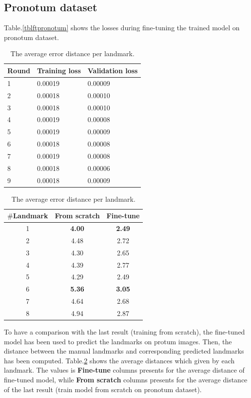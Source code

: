 \documentclass[12pt,a4paper]{article}
\begin{document}
\subsection{Pronotum dataset}
Table.\ref{tblftpronotum} shows the losses during fine-tuning the trained model on pronotum dataset.
\begin{table}[htbp]
\begin{minipage}[b]{.5\textwidth}
	\centering
	\begin{tabular}{l l l}
	Round & Training loss & Validation loss \\ \hline
	1 & 0.00019 & 0.00009  \\ \hline
	2 & 0.00018 & 0.00010 \\ \hline
	3 & 0.00018 & 0.00010 \\ \hline
	4 & 0.00019 & 0.00008 \\ \hline
	5 & 0.00019 & 0.00009 \\ \hline
	6 & 0.00018 & 0.00008 \\ \hline
	7 & 0.00019 & 0.00008 \\ \hline
	8 & 0.00018 & 0.00006 \\ \hline
	9 & 0.00018 & 0.00009 \\ \hline
	\end{tabular}
	\caption{The losses during fine-tuning model on pronotum dataset}
	\label{tblftpronotum}
\end{minipage}
\hfill
\begin{minipage}[b]{.5\textwidth}
\centering
\begin{tabular}{|c|c|c|}
\hline
\textbf{$\#$Landmark} & \textbf{From scratch} & \textbf{Fine-tune} \\ \hline
1 & \textbf{4.00} & \textbf{2.49}  \\ \hline
2 & 4.48 & 2.72  \\ \hline
3 & 4.30  & 2.65 \\ \hline
4 & 4.39  & 2.77 \\ \hline
5 & 4.29  & 2.49 \\ \hline
6 & \textbf{5.36}  & \textbf{3.05} \\ \hline
7 & 4.64  & 2.68 \\ \hline
8 & 4.94  & 2.87 \\ \hline
\end{tabular}
\caption{The average error distance per landmark.}
\label{tblcmppronotum}
\end{minipage}
\end{table}

To have a comparison with the last result (training from scratch), the fine-tuned model has been used to predict the landmarks on protum images. Then, the distance between the manual landmarks and corresponding predicted landmarks has been computed. Table.\ref{tblcmppronotum} shows the average distances which given by each landmark. The values is \textbf{Fine-tune} columns presents for the average distance of fine-tuned model, while \textbf{From scratch} columns presents for the average distance of the last result (train model from scratch on pronotum dataset).
\end{document}
